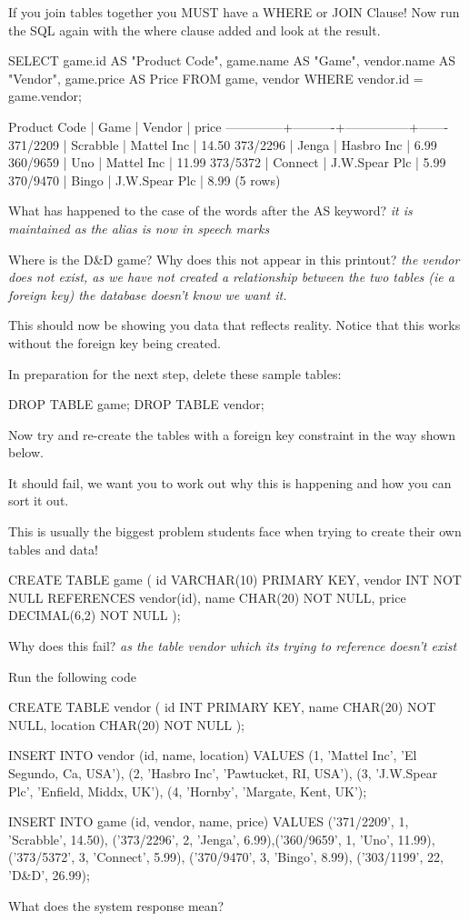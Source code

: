 If you join tables together you MUST have a WHERE or JOIN Clause!
Now run the SQL again with the where clause added and look at the result.
\begin{sql}
SELECT game.id     AS "Product Code",
       game.name   AS "Game",
       vendor.name AS "Vendor",
       game.price  AS Price 
FROM game, vendor
WHERE  vendor.id = game.vendor;
\end{sql}
\begin{pseudo}
 Product Code |   Game   |    Vendor     | price
--------------+----------+---------------+-------
 371/2209     | Scrabble | Mattel Inc    | 14.50
 373/2296     | Jenga    | Hasbro Inc    |  6.99
 360/9659     | Uno      | Mattel Inc    | 11.99
 373/5372     | Connect  | J.W.Spear Plc |  5.99
 370/9470     | Bingo    | J.W.Spear Plc |  8.99
(5 rows)
\end{pseudo}
What has happened to the case of the words after the AS keyword? \textit{it is maintained as the alias is now in speech marks}

Where is the D\&D game? Why does this not appear in this printout? \textit{the vendor does not exist, as we have not created a relationship between the two tables (ie a foreign key) the database doesn't know we want it.}

This should now be showing you data that reflects reality. Notice that this works without the foreign key being created.

In preparation for the next step, delete these sample tables:
\begin{sql}
DROP TABLE game;
DROP TABLE vendor;
\end{sql}
Now try and re-create the tables with a foreign key constraint in the way shown below.

It should fail, we want you to work out why this is happening and how you can sort it out.

This is usually the biggest problem students face when trying to create their own tables and data!
\begin{sql}
CREATE TABLE game ( 
  id     VARCHAR(10)  PRIMARY KEY,
  vendor INT          NOT NULL REFERENCES vendor(id),
  name   CHAR(20)     NOT NULL,
  price  DECIMAL(6,2) NOT NULL
);
\end{sql}
Why does this fail? \textit{as the table vendor which its trying to reference doesn't exist}

Run the following code
\begin{sql}
CREATE TABLE vendor (
  id       INT      PRIMARY KEY,
  name     CHAR(20) NOT NULL,
  location CHAR(20) NOT NULL
);

INSERT INTO vendor (id, name, location)
   VALUES (1, 'Mattel Inc', 'El Segundo, Ca, USA'),
	(2, 'Hasbro Inc', 'Pawtucket, RI, USA'),
	(3, 'J.W.Spear Plc', 'Enfield, Middx, UK'),
	(4, 'Hornby', 'Margate, Kent, UK');

INSERT INTO game (id, vendor, name, price)
VALUES ('371/2209', 1, 'Scrabble', 14.50), ('373/2296', 2, 'Jenga', 6.99),('360/9659', 1, 'Uno', 11.99), ('373/5372', 3, 'Connect', 5.99), ('370/9470', 3, 'Bingo', 8.99), ('303/1199', 22, 'D&D', 26.99);
\end{sql}
What does the system response mean?

